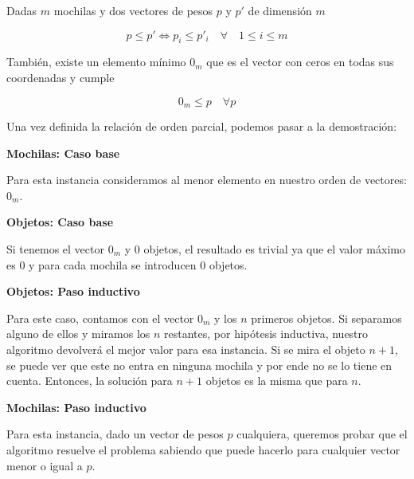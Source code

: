 Dadas $m$ mochilas y dos vectores de pesos $p$ y $p'$ de dimensión $m$

$$p \leq p' \Leftrightarrow p_i \leq p'_i \quad \forall \quad 1 \leq i \leq m$$

También, existe un elemento mínimo $0_m$ que es el vector con ceros en todas sus coordenadas y cumple

$$0_m \leq p \quad \forall p$$

Una vez definida la relación de orden parcial, podemos pasar a la demostración:

\vspace{5mm}

{\Large\textbf{Mochilas: Caso base}}

\vspace{5mm}

Para esta instancia consideramos al menor elemento en nuestro orden de vectores: $0_m$.

\vspace{5mm}

{\large\textbf{Objetos: Caso base}}

\vspace{5mm}

Si tenemos el vector $0_m$ y $0$ objetos, el resultado es trivial ya que el valor máximo es $0$ y para cada mochila se introducen $0$ objetos.

\vspace{5mm}

{\large\textbf{Objetos: Paso inductivo}}

\vspace{5mm}

Para este caso, contamos con el vector $0_m$ y los $n$ primeros objetos. Si separamos alguno de ellos y miramos los $n$ restantes, por hipótesis inductiva, nuestro algoritmo devolverá el mejor valor para esa instancia. Si se mira el objeto $n + 1$, se puede ver que este no entra en ninguna mochila y por ende no se lo tiene en cuenta. Entonces, la solución para $n + 1$ objetos es la misma que para $n$.

\vspace{5mm}

{\Large\textbf{Mochilas: Paso inductivo}}

\vspace{5mm}

Para esta instancia, dado un vector de pesos $p$ cualquiera, queremos probar que el algoritmo resuelve el problema sabiendo que puede hacerlo para cualquier vector menor o igual a $p$.

